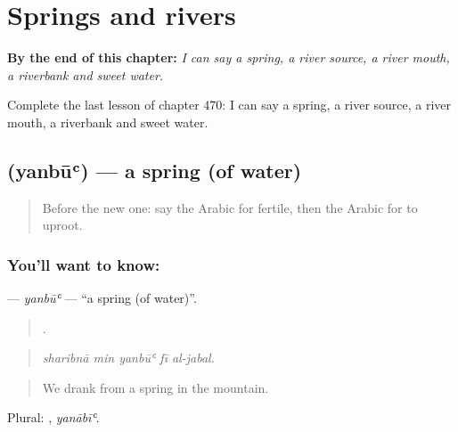 
\chapter{Springs and rivers}
\label{ch:ar-springs-and-rivers}

\begin{chapteropening}
\textbf{By the end of this chapter:} \emph{I can say a spring, a river source, a river mouth, a riverbank and sweet water.}

Complete the last lesson of chapter 470: I can say a spring, a river source, a river mouth, a riverbank and sweet water.
\end{chapteropening}

\section[\texorpdfstring{\ar{ينبوع} (yanbūʿ)}{ينبوع (yanbūʿ)}]{ (yanbūʿ) — a spring (of water)}

\label{lesson:AR-C470-yanbu}



\begin{quote}
Before the new one: say the Arabic for fertile, then the Arabic for to uproot.
\end{quote}

\subsection*{You'll want to know: }
\textbf{} — \emph{yanbūʿ} — \textquotedblleft{}a spring (of water)\textquotedblright{}.

\begin{quote}
    .
\end{quote}

\begin{quote}
\emph{sharibnā min yanbūʿ fī al-jabal.}
\end{quote}

\begin{quote}
We drank from a spring in the mountain.
\end{quote}

Plural: , \emph{yanābīʿ}.

